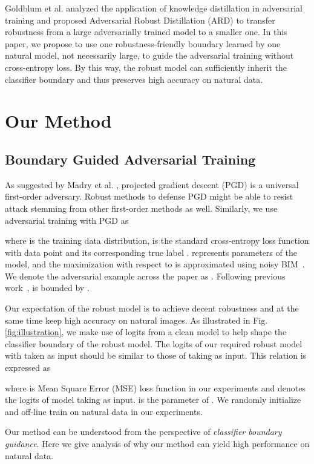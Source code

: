\documentclass[10pt,twocolumn,letterpaper]{article}
\begin{document}
Goldblum et al. \cite{goldblum2019adversarially} analyzed the application of knowledge distillation in adversarial training and proposed Adversarial Robust Distillation (ARD) to transfer robustness from a large adversarially trained model to a smaller one. In this paper, we propose to use one robustness-friendly boundary learned by one natural model, not necessarily large, to guide the adversarial training without cross-entropy loss. By this way, the robust model can sufficiently inherit the classifier boundary and thus preserves high accuracy on natural data.

\section{Our Method}
\subsection{Boundary Guided Adversarial Training}
As suggested by Madry et al. \cite{DBLP:conf/iclr/MadryMSTV18}, projected gradient descent (PGD) is a universal first-order adversary. Robust methods to defense PGD might be able to resist attack stemming from other first-order methods as well. Similarly, we use adversarial training with
PGD as

where  is the training data distribution,
 is the standard cross-entropy loss function with data point  and its corresponding true label .  represents parameters of the model, and the maximization with respect to  is approximated using noisy BIM~\cite{DBLP:conf/iclr/KurakinGB17a}. We denote the adversarial example  across the paper as . Following previous work~\cite{zhang2019theoretically,DBLP:conf/iclr/MadryMSTV18},  is bounded by .

Our expectation of the robust model is to achieve decent robustness and at the same time keep high accuracy on natural images. 
As illustrated in Fig. \ref{fig:illustration}, we make use of logits from a clean model to help shape the classifier boundary of the robust model. The logits of our required robust model  with  taken as input should be similar to those of  taking  as input. This relation is expressed as

where  is Mean Square Error (MSE) loss function in our experiments and  denotes the logits of model  taking  as input.  is the parameter of . We randomly initialize  and off-line train  on natural data in our experiments.

Our method can be understood from the perspective of \textit{classifier boundary guidance}. Here we give analysis of why our method can yield high performance on natural data.
\end{document}

